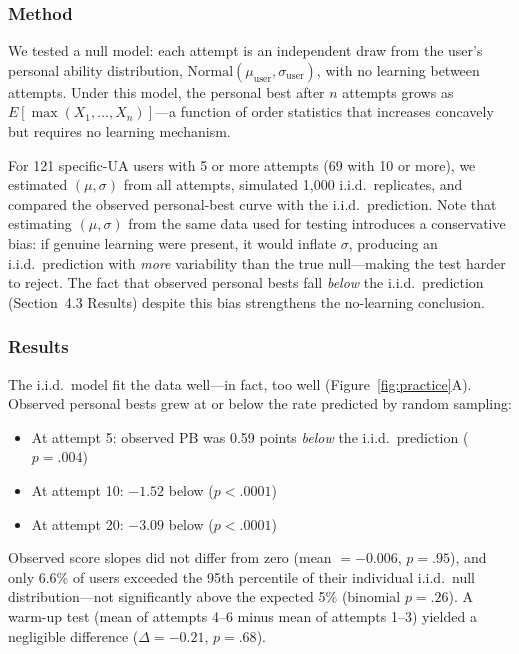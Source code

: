 \documentclass[12pt]{article}
\begin{document}
\subsubsection{Method}

We tested a null model: each attempt is an independent draw from the user's personal ability distribution, $\text{Normal}(\mu_{\text{user}}, \sigma_{\text{user}})$, with no learning between attempts. Under this model, the personal best after $n$ attempts grows as $E[\max(X_1, \ldots, X_n)]$---a function of order statistics that increases concavely but requires no learning mechanism.

For 121 specific-UA users with 5 or more attempts (69 with 10 or more), we estimated $(\mu, \sigma)$ from all attempts, simulated 1,000 i.i.d.\ replicates, and compared the observed personal-best curve with the i.i.d.\ prediction. Note that estimating $(\mu, \sigma)$ from the same data used for testing introduces a conservative bias: if genuine learning were present, it would inflate $\sigma$, producing an i.i.d.\ prediction with \textit{more} variability than the true null---making the test harder to reject. The fact that observed personal bests fall \textit{below} the i.i.d.\ prediction (Section~4.3 Results) despite this bias strengthens the no-learning conclusion.

\subsubsection{Results}

The i.i.d.\ model fit the data well---in fact, too well (Figure~\ref{fig:practice}A). Observed personal bests grew at or below the rate predicted by random sampling:

\begin{itemize}
    \item At attempt 5: observed PB was 0.59 points \textit{below} the i.i.d.\ prediction ($p = .004$)
    \item At attempt 10: $-1.52$ below ($p < .0001$)
    \item At attempt 20: $-3.09$ below ($p < .0001$)
\end{itemize}

Observed score slopes did not differ from zero (mean $= -0.006$, $p = .95$), and only 6.6\% of users exceeded the 95th percentile of their individual i.i.d.\ null distribution---not significantly above the expected 5\% (binomial $p = .26$). A warm-up test (mean of attempts 4--6 minus mean of attempts 1--3) yielded a negligible difference ($\Delta = -0.21$, $p = .68$).
\end{document}
